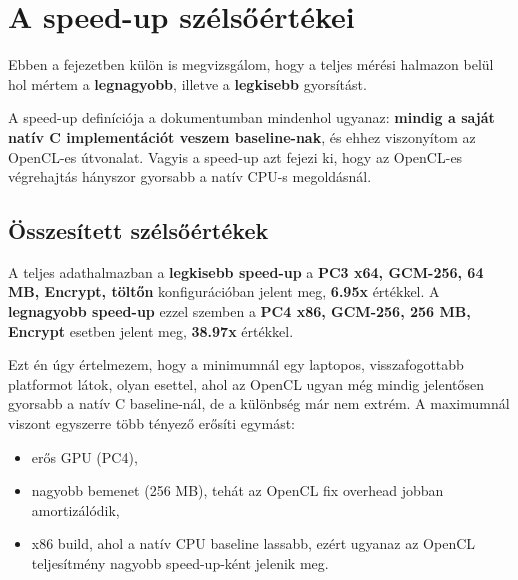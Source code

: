 \chapter{A speed-up szélsőértékei}

Ebben a fejezetben külön is megvizsgálom, hogy a teljes mérési halmazon belül
hol mértem a \textbf{legnagyobb}, illetve a \textbf{legkisebb} gyorsítást.

A speed-up definíciója a dokumentumban mindenhol ugyanaz:
\textbf{mindig a saját natív C implementációt veszem baseline-nak}, és ehhez
viszonyítom az OpenCL-es útvonalat. Vagyis a speed-up azt fejezi ki,
hogy az OpenCL-es végrehajtás hányszor gyorsabb a natív CPU-s megoldásnál.

\section{Összesített szélsőértékek}

\begin{table}[H]
  \centering
  \caption{A teljes mérési halmaz legkisebb és legnagyobb OpenCL speed-up értéke.}
\end{table}

A teljes adathalmazban a \textbf{legkisebb speed-up} a \textbf{PC3 x64, GCM-256, 64 MB, Encrypt, töltőn}
konfigurációban jelent meg, \textbf{6.95x} értékkel. A \textbf{legnagyobb speed-up} ezzel szemben a
\textbf{PC4 x86, GCM-256, 256 MB, Encrypt} esetben jelent meg, \textbf{38.97x} értékkel.

Ezt én úgy értelmezem, hogy a minimumnál egy laptopos, visszafogottabb platformot látok,
olyan esettel, ahol az OpenCL ugyan még mindig jelentősen gyorsabb a natív C baseline-nál,
de a különbség már nem extrém. A maximumnál viszont egyszerre több tényező erősíti egymást:
\begin{itemize}
  \item erős GPU (PC4),
  \item nagyobb bemenet (256 MB), tehát az OpenCL fix overhead jobban amortizálódik,
  \item x86 build, ahol a natív CPU baseline lassabb, ezért ugyanaz az OpenCL teljesítmény nagyobb speed-up-ként jelenik meg.
\end{itemize}

